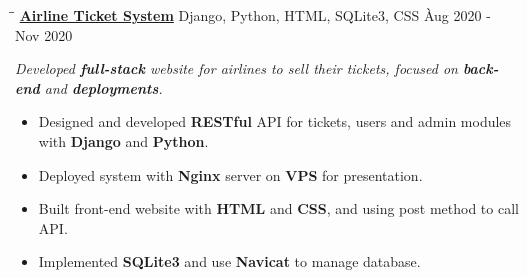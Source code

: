 \documentclass{res}
\begin{document}
\begin{resume}
    \vspace{0.00in}
    \begin{tabbing}
    \hspace{2.391in}\= \hspace{3in}\= \kill %
    \href{https://github.com/DolorHunter/AirlineTicketSystem}{\bf Airline Ticket System}  \> 
                Django, Python, HTML, SQLite3, CSS \` Aug 2020 - Nov 2020 \\
    \end{tabbing}\vspace{-20pt}      %
    \vspace{-0.1in}
    \textit{Developed {\bf full-stack} website for airlines to sell their tickets, 
                focused on {\bf back-end} and {\bf deployments}.}
    \vspace{+0.05in}
    \begin{itemize} \itemsep 1.5pt %
        \item Designed and developed {\bf RESTful} API for tickets, users and admin modules with 
                {\bf Django} and {\bf Python}.
        \item Deployed system with {\bf Nginx} server on {\bf VPS} for presentation.
        \item Built front-end website with {\bf HTML} and {\bf CSS}, and using post method 
                to call API.
        \item Implemented {\bf SQLite3} and use {\bf Navicat} to manage database.
    \end{itemize}


\end{resume}
\end{document}
